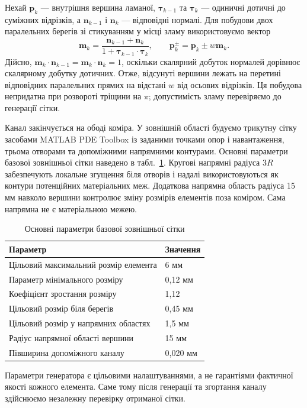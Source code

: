 Нехай $\boldsymbol p_k$ --- внутрішня вершина ламаної, $\boldsymbol\tau_{k-1}$ та $\boldsymbol\tau_k$ --- одиничні дотичні до суміжних відрізків, а $\boldsymbol n_{k-1}$ і $\boldsymbol n_k$ --- відповідні нормалі. Для побудови двох паралельних берегів зі стикуванням у місці зламу використовуємо вектор
\begin{equation}
 \boldsymbol m_k=
 \frac{\boldsymbol n_{k-1}+\boldsymbol n_k}
 {1+\boldsymbol\tau_{k-1}\cdot\boldsymbol\tau_k},
 \qquad
 \boldsymbol p_k^\pm=\boldsymbol p_k\pm w\boldsymbol m_k.
 \label{eq:method-miter}
\end{equation}
Дійсно, $\boldsymbol m_k\cdot\boldsymbol n_{k-1}=
\boldsymbol m_k\cdot\boldsymbol n_k=1$, оскільки скалярний добуток нормалей дорівнює скалярному добутку дотичних. Отже, відсунуті вершини лежать на перетині відповідних паралельних прямих на відстані $w$ від осьових відрізків. Ця побудова непридатна при розвороті тріщини на $\pi$; допустимість зламу перевіряємо до генерації сітки.

Канал закінчується на ободі коміра. У зовнішній області будуємо трикутну сітку засобами MATLAB PDE Toolbox із заданими точками опор і навантаження, трьома отворами та допоміжними напрямними контурами. Основні параметри базової зовнішньої сітки наведено в табл.~\ref{tab:method-mesh-params}. Кругові напрямні радіуса $3R$ забезпечують локальне згущення біля отворів і надалі використовуються як контури потенційних матеріальних меж. Додаткова напрямна область радіуса 15 мм навколо вершини контролює зміну розмірів елементів поза коміром. Сама напрямна не є матеріальною межею.

\begin{table}[htbp]
 \centering
 \caption{Основні параметри базової зовнішньої сітки}
 \label{tab:method-mesh-params}
 \begin{tabularx}{\textwidth}{Xl}
 \toprule
 Параметр & Значення\\
 \midrule
 Цільовий максимальний розмір елемента & 6 мм\\
 Параметр мінімального розміру & 0,12 мм\\
 Коефіцієнт зростання розміру & 1,12\\
 Цільовий розмір біля берегів & 0,45 мм\\
 Цільовий розмір у напрямних областях & 1,5 мм\\
 Радіус напрямної області вершини & 15 мм\\
 Півширина допоміжного каналу & 0,020 мм\\
 \bottomrule
 \end{tabularx}
\end{table}
Параметри генератора є цільовими налаштуваннями, а не гарантіями фактичної якості кожного елемента. Саме тому після генерації та згортання каналу здійснюємо незалежну перевірку отриманої сітки.

